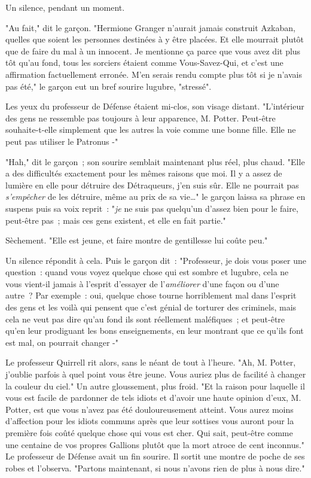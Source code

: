Un silence, pendant un moment.

"Au fait," dit le garçon. "Hermione Granger n'aurait jamais construit Azkaban, quelles que soient les personnes destinées à y être placées. Et elle mourrait plutôt que de faire du mal à un innocent. Je mentionne ça parce que vous avez dit plus tôt qu'au fond, tous les sorciers étaient comme Vous-Savez-Qui, et c'est une affirmation factuellement erronée. M'en serais rendu compte plus tôt si je n'avais pas été," le garçon eut un bref sourire lugubre, "stressé".

Les yeux du professeur de Défense étaient mi-clos, son visage distant. "L'intérieur des gens ne ressemble pas toujours à leur apparence, M. Potter. Peut-être souhaite-t-elle simplement que les autres la voie comme une bonne fille. Elle ne peut pas utiliser le Patronus -"

"Hah," dit le garçon~; son sourire semblait maintenant plus réel, plus chaud. "Elle a des difficultés exactement pour les mêmes raisons que moi. Il y a assez de lumière en elle pour détruire des Détraqueurs, j'en suis sûr. Elle ne pourrait pas \emph{s'empêcher} de les détruire, même au prix de sa vie…" le garçon laissa sa phrase en suspens puis sa voix reprit~: "\emph{je} ne suis pas quelqu'un d'assez bien pour le faire, peut-être pas~; mais ces gens existent, et elle en fait partie."

Sèchement. "Elle est jeune, et faire montre de gentillesse lui coûte peu."

Un silence répondit à cela. Puis le garçon dit~: "Professeur, je dois vous poser une question~: quand vous voyez quelque chose qui est sombre et lugubre, cela ne vous vient-il jamais à l'esprit d'essayer de l'\emph{améliorer} d'une façon ou d'une autre~? Par exemple~: oui, quelque chose tourne horriblement mal dans l'esprit des gens et les voilà qui pensent que c'est génial de torturer des criminels, mais cela ne veut pas dire qu'au fond ils sont réellement maléfiques~; et peut-être qu'en leur prodiguant les bons enseignements, en leur montrant que ce qu'ils font est mal, on pourrait changer -"

Le professeur Quirrell rit alors, sans le néant de tout à l'heure. "Ah, M. Potter, j'oublie parfois à quel point vous être jeune. Vous auriez plus de facilité à changer la couleur du ciel." Un autre gloussement, plus froid. "Et la raison pour laquelle il vous est facile de pardonner de tels idiots et d'avoir une haute opinion d'eux, M. Potter, est que vous n'avez pas été douloureusement atteint. Vous aurez moins d'affection pour les idiots communs après que leur sottises vous auront pour la première fois coûté quelque chose qui vous est cher. Qui sait, peut-être comme une centaine de vos propres Gallions plutôt que la mort atroce de cent inconnus." Le professeur de Défense avait un fin sourire. Il sortit une montre de poche de ses robes et l'observa. "Partons maintenant, si nous n'avons rien de plus à nous dire."

